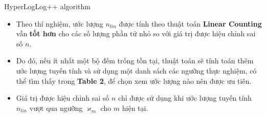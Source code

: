 \documentclass[10pt]{beamer}
\begin{document}
\begin{frame}{HyperLogLog++ algorithm}
  \begin{itemize}
    \item Theo thí nghiệm, ước lượng $n_{lin}$ được tính theo thuật toán 
    \textbf{Linear Counting} vẫn \textbf{tốt hơn} cho các số lượng phần tử nhỏ so với giá trị được hiệu 
    chỉnh sai số $n$.
    \item Do đó, nếu ít nhất một bộ đếm trống tồn tại, thuật toán sẽ tính toán thêm 
    ước lượng tuyến tính và sử dụng một danh sách các ngưỡng thực nghiệm, có thể 
    tìm thấy trong \textbf{Table 2}, để chọn xem ước lượng nào nên được ưu tiên. 
    \item Giá trị được hiệu chỉnh sai số $n$ chỉ được sử dụng khi ước lượng tuyến tính 
    $n_{lin}$ vượt qua ngưỡng $\varkappa_m$ cho $m$ hiện tại.
  \end{itemize}
\end{frame}
\end{document}

